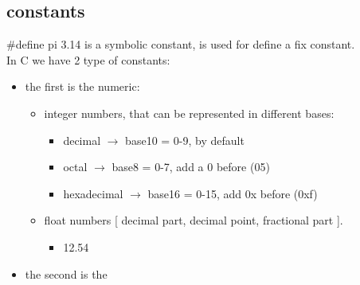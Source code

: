         \subsection{constants}
            \#define pi 3.14 is a symbolic constant, is used for define a fix constant.\\ In C we have 2 type of constants:
            \begin{itemize}
                \item the first is the numeric:
                \begin{itemize}
                    \item integer numbers, that can be represented in different bases:
                    \begin{itemize}
                        \item decimal $\rightarrow$  base10 = 0-9, by default
                        \item octal $\rightarrow$  base8 = 0-7, add a 0 before (05)
                        \item hexadecimal $\rightarrow$  base16 = 0-15, add 0x before (0xf)
                    \end{itemize}
                    \item float numbers [ decimal part, decimal point, fractional part ].
                        \begin{itemize}
                            \item 12.54
                        \end{itemize}
                \end{itemize}
                \item the second is the
                

\end{itemize}
